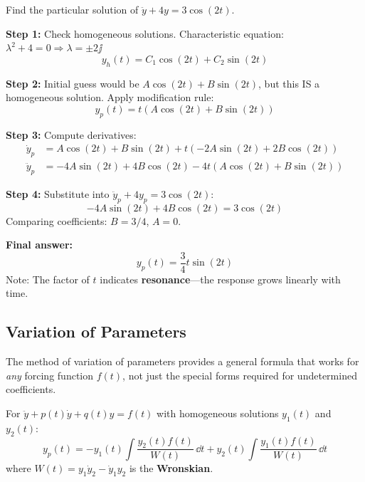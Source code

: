 \begin{examplebox}[title=Example: Undetermined Coefficients with Sinusoidal Forcing]
Find the particular solution of $\ddot{y} + 4y = 3\cos(2t)$.

\textbf{Step 1:} Check homogeneous solutions. Characteristic equation: $\lambda^2 + 4 = 0 \Rightarrow \lambda = \pm 2\jj$
\begin{equation}
y_h(t) = C_1\cos(2t) + C_2\sin(2t)
\end{equation}

\textbf{Step 2:} Initial guess would be $A\cos(2t) + B\sin(2t)$, but this IS a homogeneous solution. Apply modification rule:
\begin{equation}
y_p(t) = t(A\cos(2t) + B\sin(2t))
\end{equation}

\textbf{Step 3:} Compute derivatives:
\begin{align}
\dot{y}_p &= A\cos(2t) + B\sin(2t) + t(-2A\sin(2t) + 2B\cos(2t)) \\
\ddot{y}_p &= -4A\sin(2t) + 4B\cos(2t) - 4t(A\cos(2t) + B\sin(2t))
\end{align}

\textbf{Step 4:} Substitute into $\ddot{y}_p + 4y_p = 3\cos(2t)$:
\begin{equation}
-4A\sin(2t) + 4B\cos(2t) = 3\cos(2t)
\end{equation}
Comparing coefficients: $B = 3/4$, $A = 0$.

\textbf{Final answer:}
\begin{equation}
y_p(t) = \frac{3}{4}t\sin(2t)
\end{equation}
Note: The factor of $t$ indicates \textbf{resonance}---the response grows linearly with time.
\end{examplebox}

\subsection{Variation of Parameters}

The method of variation of parameters provides a general formula that works for \emph{any} forcing function $f(t)$, not just the special forms required for undetermined coefficients.

\begin{keyconceptbox}[title=Variation of Parameters Formula (Second-Order)]
For $\ddot{y} + p(t)\dot{y} + q(t)y = f(t)$ with homogeneous solutions $y_1(t)$ and $y_2(t)$:
\begin{equation}
y_p(t) = -y_1(t)\int \frac{y_2(t)f(t)}{W(t)} \, \dd t + y_2(t)\int \frac{y_1(t)f(t)}{W(t)} \, \dd t
\end{equation}
where $W(t) = y_1\dot{y}_2 - \dot{y}_1 y_2$ is the \textbf{Wronskian}.
\end{keyconceptbox}

